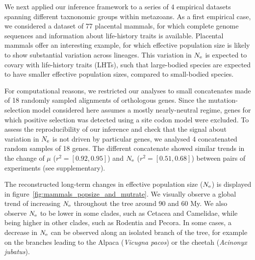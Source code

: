We next applied our inference framework to a series of 4 empirical datasets spanning different taxnonomic groups within metazoans.
As a first empirical case, we considered a dataset of 77 placental mammals, for which complete genome sequences and information about life-history traits is available.
Placental mammals offer an interesting example, for which {effective population size} is likely to show substantial variation across lineages.
This variation in $N_{\text{e}}$ is expected to covary with life-history traits ({LHT}s), such that large-bodied species are expected to have smaller effective population sizes, compared to small-bodied species.

For computational reasons, we restricted our analyses to small concatenates made of 18 randomly sampled alignments of orthologous genes.
Since the mutation-selection model considered here assumes a mostly nearly-neutral regime, genes for which positive selection was detected using a site codon model were excluded.
To assess the reproducibility of our inference and check that the signal about variation in $N_{\text{e}}$ is not driven by particular genes, we analysed 4 concatenated random samples of 18 genes.
The different concatenate showed similar trends in the change of $\mu$ ($r^2=[0.92,0.95]$) and $N_{\text{e}}$ ($r^2=[0.51,0.68]$) between pairs of experiments (see supplementary).

The reconstructed long-term changes in {effective population size} ($N_{\text{e}}$) is displayed in figure~\ref{fig:mammals_popsize_and_mutrate}.
We visually observe a global trend of increasing $N_{\text{e}}$ throughout the tree around 90 and 60 My.
We also observe $N_{\text{e}}$ to be lower in some clades, such as Cetacea and Camelidae, while being higher in other clades, such as Rodentia and Pecora.
In some cases, a decrease in $N_{\text{e}}$ can be observed along an isolated branch of the tree, for example on the branches leading to the Alpaca (\textit{Vicugna pacos}) or the cheetah (\textit{Acinonyx jubatus}).

